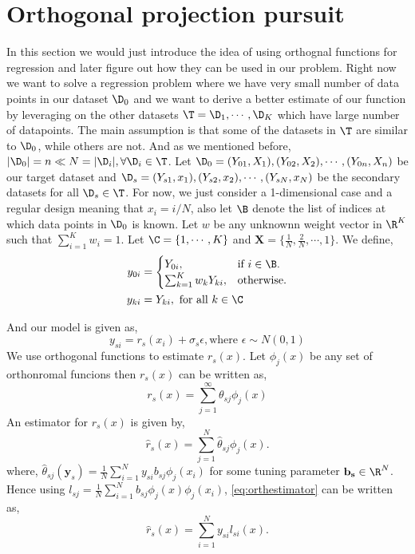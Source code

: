 \section{Orthogonal projection pursuit}
In this section we would just introduce the idea of using orthognal functions
for regression and later figure out how they can be used in our problem.
Right now we want to solve a regression problem where we have very small
number of data points in our dataset $\D_0$ and we want to derive a better
estimate of our function by leveraging on the other datasets $\T =
{\D_1,\cdots,\D_K}$ which have large number of datapoints. The main assumption
is that some of the datasets in $\T$ are similar to $\D_0$, while others are
not. And as we mentioned before, $ |\D_0| = n\ll N = |\D_i|, \forall \D_i \in
\T$.
Let $\D_0 = (Y_{01}, X_1), (Y_{02}, X_2),\cdots, (Y_{0n}, X_n)$ be our target
dataset and $\D_s = (Y_{s1}, x_1), (Y_{s2}, x_2),\cdots, (Y_{sN}, x_N)$ be the
secondary datasets for all $\D_s \in \T$. For now, we just consider a
1-dimensional case and a regular design meaning that $x_i = i/N$, also let $\B$
denote the list of indices  at which data points in $\D_0$ is known.
Let $w$ be any unknownn weight vector in $\R^K$ such that $\sum_{i=1}^{K}w_i =
1$. Let $\C = \{1,\cdots,K\}$ and $\mathbf{X} = \{
\frac{1}{N},\frac{2}{N}, \cdots,1\}$. We define,
\begin{align}
 y_{0i} &= \begin{cases}  Y_{0i} , & \text{if }i \in \B.\\
    					\sum_{k = 1}^{K}w_k Y_{ki}, & \text{otherwise}.
  		  \end{cases}\\
y_{ki} &= Y_{ki}, \text{ for all }k \in \C
\end{align}

And our model is given as,
$$
y_{si} = r_{s}(x_i) + \sigma_s \epsilon, \text{where }\epsilon \sim N(0,1)
$$
We use orthogonal functions to estimate $r_s (x)$. Let $\phi_j(x)$ be any set
of orthonromal funcions then $r_s(x)$ can be written as, 
$$
r_s (x) = \sum_{j = 1}^{\infty} \theta_{sj} \phi_j (x)
$$
An estimator for $r_s(x)$ is given by,
\begin{equation}
\label{eq:orthestimator}
\hat{r}_s (x) = \sum_{j = 1}^{N} \hat{\theta}_{sj} \phi_j (x).
\end{equation}
where, $\hat{\theta}_{sj}(\mathbf{y}_{s}) = \frac{1}{N}\sum_{i = 1}^{N}
y_{si}b_{sj}\phi_j(x_i)$ for some tuning parameter $\mathbf{b_s} \in \R^N$.
Hence using $l_{sj} = \frac{1}{N}\sum_{i = 1}^{N} b_{sj} \phi_j(x)\phi_j(x_i)$,
\eqref{eq:orthestimator} can be written as,
\begin{equation}
\label{eq:orthestimator2}
\hat{r}_s (x) = \sum_{i = 1}^{N} y_{si} l_{si} (x).
\end{equation}

